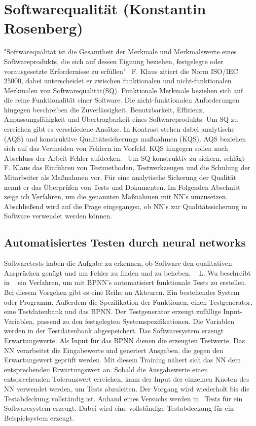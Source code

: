 \section{Softwarequalität (Konstantin Rosenberg)}
"Softwarequalität ist die Gesamtheit der Merkmale und Merkmalswerte eines Softwareprodukts, die sich auf dessen Eignung beziehen,
festgelegte oder vorausgesetzte
Erfordernisse zu erfüllen"~\cite[p.~20]{Franz2015}
F. Klaus zitiert die Norm ISO/IEC 25000, dabei unterscheidet er zwischen funktionalen und nicht-funktionalen Merkmalen von Softwarequalität(SQ).
Funktionale Merkmale beziehen sich auf die reine Funktionalität einer Software. Die nicht-funktionalen Anforderungen hingegen beschreiben die Zuverlässigkeit, Benutzbarkeit, Effizienz, Anpassungsfähigkeit und Übertragbarkeit eines Softwareprodukts.
Um SQ zu erreichen gibt es verschiedene Ansätze. In Kontrast stehen dabei analytische (AQS) und konstruktive Qualitätssicherungs
maßnahmen (KQS). AQS beziehen sich auf das Vermeiden von Fehlern im Vorfeld. KQS hingegen sollen nach Abschluss der Arbeit Fehler aufdecken.~\cite[p.~29]{Franz2015} 
Um SQ konstruktiv zu sichern, schlägt F. Klaus das Einführen von Testmethoden, Testwerkzeugen und die Schulung der Mitarbeiter als Maßnahmen vor. Für eine analytische Sicherung der Qualität nennt er das Überprüfen von Tests und Dokumenten.
Im Folgenden Abschnitt zeige ich Verfahren, um die genannten Maßnahmen mit NN's umzusetzen. Abschließend wird auf die Frage eingegangen, ob NN's zur Qualitätssicherung in Software verwendet werden können.

\subsection{Automatisiertes Testen durch neural networks}
Softwaretests haben die Aufgabe zu erkennen, ob Software den qualitativen Ansprüchen genügt und um Fehler zu finden und zu beheben. ~\cite{Wu2008}
L. Wu beschreibt in ~\cite{Wu2008} ein Verfahren, um mit BPNN's automatisiert funktionale Tests zu erstellen. 
Bei diesem Vorgehen gibt es eine Reihe an Akteuren. Ein bestehendes System oder Programm. Außerdem die Spezifikation der Funktionen, einen Testgenerator, eine Testdatenbank und das BPNN. Der Testgenerator erzeugt zufällige Input-Variablen, passend zu den festgelegten Systemspezifikationen. Die Variablen werden in der Testdatenbank abgespeichert. Das Softwaresystem erzeugt Erwartungswerte. Als Input für das BPNN dienen die erzeugten Testwerte. Das NN verarbeitet die Eingabewerte und generiert Ausgaben, die gegen den Erwartungswert geprüft werden.
Mit diesem Training nähert sich das NN dem entsprechenden Erwartungswert an.
Sobald die Ausgabewerte einen entsprechenden Toleranzwert erreichen, kann der Input der einzelnen Knoten des NN verwendet werden, um Tests abzuleiten. Der Vorgang wird wiederholt bis die Testabdeckung vollständig ist. Anhand eines Versuchs werden in~\cite{Wu2008} Tests für ein Softwaresystem erzeugt. Dabei wird eine vollständige Testabdeckung für ein Beispielsystem erzeugt.\\

